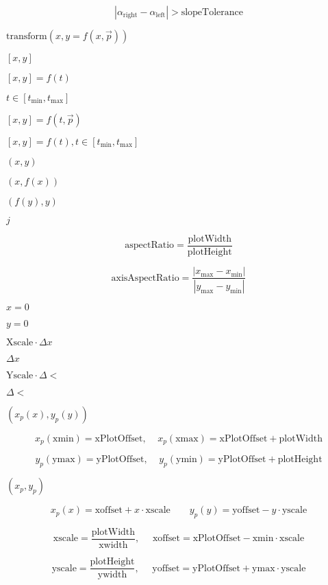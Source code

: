 \documentclass{article}
\begin{document}
\[ \left|\alpha_{\mbox{right}}-\alpha_{\mbox{left}}\right|>\mbox{slopeTolerance} \]
\pagebreak

$ \mbox{transform}\left(x, y=f(x, \vec{p})\right) $
\pagebreak

$ [x,y] $
\pagebreak

$ [x,y]=f(t) $
\pagebreak

$ t \in \left[t_\text{min}, t_\text{max}\right] $
\pagebreak

$ [x,y]=f(t, \vec{p}) $
\pagebreak

$ [x,y]=f(t), t \in \left[t_\text{min}, t_\text{max}\right] $
\pagebreak

$ (x,y) $
\pagebreak

$ \left(x, f(x) \right) $
\pagebreak

$ \left(f(y), y \right) $
\pagebreak

$ j $
\pagebreak

\[ \mbox{aspectRatio}=\frac{\mbox{plotWidth}}{\mbox{plotHeight}} \]
\pagebreak

\[ \mbox{axisAspectRatio}=\frac{\left|x_\text{max}-x_\text{min}\right|}{\left|y_\text{max}-y_\text{min}\right|} \]
\pagebreak

$ x=0 $
\pagebreak

$ y=0 $
\pagebreak

$ \mbox{Xscale}\cdot\Delta x $
\pagebreak

$ \Delta x $
\pagebreak

$ \mbox{Yscale}\cdot\Delta < $
\pagebreak

$ \Delta < $
\pagebreak

$ (x_p(x), y_p(y)) $
\pagebreak

\[ x_p(\mbox{xmin})=\mbox{xPlotOffset},\ \ \ \ \ x_p(\mbox{xmax})=\mbox{xPlotOffset}+\mbox{plotWidth} \]
\pagebreak

\[ y_p(\mbox{ymax})=\mbox{yPlotOffset},\ \ \ \ \ y_p(\mbox{ymin})=\mbox{yPlotOffset}+\mbox{plotHeight} \]
\pagebreak

$ (x_p, y_p) $
\pagebreak

\[ x_p(x)=\mbox{xoffset}+x\cdot\mbox{xscale} \ \ \ \ \ \ \ \ \ y_p(y)=\mbox{yoffset}-y\cdot\mbox{yscale} \]
\pagebreak

\[ \mbox{xscale}=\frac{\mbox{plotWidth}}{\mbox{xwidth}},\ \ \ \ \ \ \mbox{xoffset}=\mbox{xPlotOffset}-\mbox{xmin}\cdot\mbox{xscale} \]
\pagebreak

\[ \mbox{yscale}=\frac{\mbox{plotHeight}}{\mbox{ywidth}},\ \ \ \ \ \ \mbox{yoffset}=\mbox{yPlotOffset}+\mbox{ymax}\cdot\mbox{yscale} \]
\pagebreak
\end{document}
